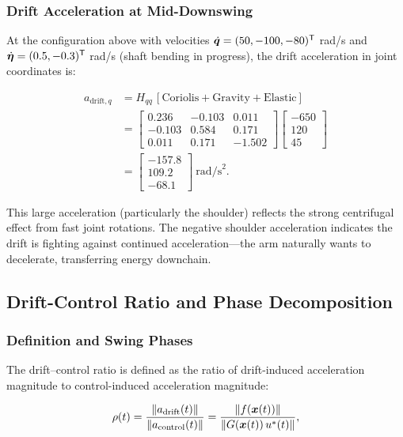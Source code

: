 \subsubsection{Drift Acceleration at Mid-Downswing}

At the configuration above with velocities $\dot{\bm{q}} = (50, -100, -80)^{\mathsf{T}}$ rad/s and
$\dot{\bm{\eta}} = (0.5, -0.3)^{\mathsf{T}}$ rad/s (shaft bending in progress), the drift
acceleration in joint coordinates is:

\begin{align}
a_{\text{drift},q} &= H_{qq}\,[\text{Coriolis} + \text{Gravity} + \text{Elastic}] \\
&= \begin{bmatrix}
0.236 & -0.103 & 0.011 \\
-0.103 & 0.584 & 0.171 \\
0.011 & 0.171 & -1.502
\end{bmatrix}
\begin{bmatrix}
-650 \\
120 \\
45
\end{bmatrix} \\
&= \begin{bmatrix}
-157.8 \\
109.2 \\
-68.1
\end{bmatrix}~\text{rad/s}^2.
\label{eq:ch8:drift-accel}
\end{align}

This large acceleration (particularly the shoulder) reflects the strong centrifugal
effect from fast joint rotations. The negative shoulder acceleration indicates the drift
is fighting against continued acceleration---the arm naturally wants to decelerate,
transferring energy downchain.

\subsection{Drift-Control Ratio and Phase Decomposition}

\subsubsection{Definition and Swing Phases}

The drift--control ratio is defined as the ratio of drift-induced acceleration magnitude
to control-induced acceleration magnitude:

\begin{equation}
\rho(t) = \frac{\|a_{\text{drift}}(t)\|}{\|a_{\text{control}}(t)\|} = \frac{\|f(\bm{x}(t))\|}{\|G(\bm{x}(t))\,u^*(t)\|},
\label{eq:ch8:rho-def}
\end{equation}

